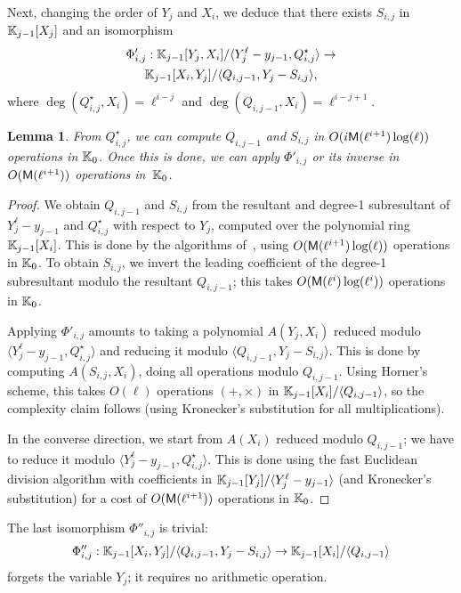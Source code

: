 \documentclass{sig-alternate}
\newtheorem{lemma}[definition]{Lemma}
\begin{document}
Next, changing the order of $Y_j$ and $X_i$, we deduce that there
exists $S_{i,j}$ in $\mathbb{K}_{j-1}[X_j]$ and an isomorphism
\begin{multline*}
\Phi'_{i,j}: \mathbb{K}_{j-1}[Y_j,X_i]/\langle Y_j^\ell-y_{j-1}, Q^\star_{i,j}\rangle
\to\\ \mathbb{K}_{j-1}[X_i, Y_j]/\langle Q_{i,j-1}, Y_j-S_{i,j}\rangle,
\end{multline*}
where $\deg(Q^\star_{i,j},X_i)=\ell^{i-j}$ and
$\deg(Q_{i,j-1},X_i)=\ell^{i-j+1}$. 
\begin{lemma}
  From $Q^\star_{i,j}$, we can compute $Q_{i,j-1}$ and $S_{i,j}$
  in $O(i\mathsf{M}(\ell^{i+1})\log(\ell))$ operations in $\mathbb{K}_0$.
  Once this is done, we can apply $\Phi'_{i,j}$ or its inverse 
  in $O(\mathsf{M}(\ell^{i+1}))$ operations in~$\mathbb{K}_0$.
\end{lemma}
\begin{proof}
  We obtain $Q_{i,j-1}$ and $S_{i,j}$ from the resultant and degree-1
  subresultant of $Y_j^\ell-y_{j-1}$ and $Q^\star_{i,j}$ with respect to
  $Y_j$, computed over the polynomial ring $\mathbb{K}_{j-1}[X_i]$. This is
  done by the algorithms of~\cite{Reischert97,LiRo01}, using
  $O(\mathsf{M}(\ell^{i+1})\log(\ell))$ operations in $\mathbb{K}_0$. To obtain
  $S_{i,j}$, we invert the leading coefficient of the degree-1
  subresultant modulo the resultant $Q_{i,j-1}$; this takes
  $O(\mathsf{M}(\ell^{i})\log(\ell^i))$ operations in $\mathbb{K}_0$.

  Applying $\Phi'_{i,j}$ amounts to taking a polynomial $A(Y_j,X_i)$ 
  reduced modulo $\langle Y_j^\ell-y_{j-1}, Q^\star_{i,j}\rangle$
  and reducing it modulo $\langle Q_{i,j-1}, Y_j-S_{i,j}\rangle$. This
  is done by computing $A(S_{i,j},X_i)$, doing all operations
  modulo $Q_{i,j-1}$. Using Horner's scheme, this takes $O(\ell)$ 
  operations $(+,\times)$ in $\mathbb{K}_{j-1}[X_i]/\langle Q_{i,j-1}\rangle$,
  so the complexity claim follows (using Kronecker's substitution for
  all multiplications).

  In the converse direction, we start from $A(X_i)$ reduced modulo
  $Q_{i,j-1}$; we have to reduce it modulo $\langle Y_j^\ell-y_{j-1},
  Q^\star_{i,j}\rangle$. This is done using the fast Euclidean
  division algorithm with coefficients in $\mathbb{K}_{j-1}[Y_j]/\langle
  Y_j^\ell-y_{j-1}\rangle$ (and Kronecker's substitution) for a cost of $O(\mathsf{M}(\ell^{i+1}))$
  operations in $\mathbb{K}_0$.
\end{proof}

The last isomorphism $\Phi''_{i,j}$ is trivial:
$$\Phi''_{i,j}: \mathbb{K}_{j-1}[X_i, Y_j]/\langle Q_{i,j-1}, Y_j-S_{i,j}\rangle
\to \mathbb{K}_{j-1}[X_i]/\langle Q_{i,j-1}\rangle$$
forgets the variable $Y_j$; it requires no arithmetic operation.
\end{document}

